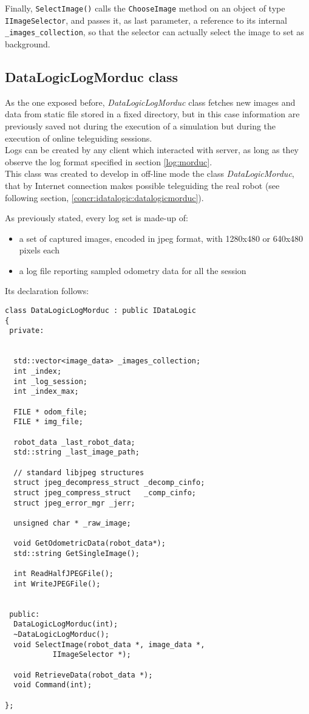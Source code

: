 Finally, \texttt{SelectImage()} calls the \texttt{ChooseImage} method 
on an object of type \texttt{IImageSelector}, and passes it, as last 
parameter, a reference to its internal \texttt{\_images\_collection}, 
so that the selector can actually select the image to set as 
background.


\subsection{DataLogicLogMorduc class}
\label{concr:idatalogic:datalogiclogmorduc}

As the one exposed before, \textit{DataLogicLogMorduc} class
fetches new images and data from static file
stored in a fixed directory, but in this case information are previously saved
not during the execution of a simulation but during
the execution of online teleguiding sessions.
\\
Logs can be created by any client which interacted with \morduc{}
server, as long as they observe the log format specified in section
\ref{log:morduc}.
\\
This class was created to develop in off-line mode the class
\textit{DataLogicMorduc}, that by Internet connection makes possible
teleguiding the real robot (see following section,
\ref{concr:idatalogic:datalogicmorduc}).

As previously stated, every log set is made-up of:

\begin{itemize}
  \item a set of captured images, encoded in jpeg format,
    with 1280x480 or 640x480 pixels each
  \item a log file reporting sampled odometry data
    for all the session
\end{itemize}

Its declaration follows:
\\
\begin{lstlisting}[caption={\texttt{DataLogicLogMorduc} declaration},
    label={code:datalogiclogmorduc:declaration}]
class DataLogicLogMorduc : public IDataLogic
{
 private:

  
  std::vector<image_data> _images_collection;
  int _index;
  int _log_session;
  int _index_max;

  FILE * odom_file;
  FILE * img_file;

  robot_data _last_robot_data;
  std::string _last_image_path;

  // standard libjpeg structures
  struct jpeg_decompress_struct _decomp_cinfo;
  struct jpeg_compress_struct   _comp_cinfo;
  struct jpeg_error_mgr _jerr;

  unsigned char * _raw_image;
 
  void GetOdometricData(robot_data*);
  std::string GetSingleImage();

  int ReadHalfJPEGFile();
  int WriteJPEGFile();

  
 public:
  DataLogicLogMorduc(int);
  ~DataLogicLogMorduc();
  void SelectImage(robot_data *, image_data *,
		   IImageSelector *);

  void RetrieveData(robot_data *);
  void Command(int);

};
\end{lstlisting}

